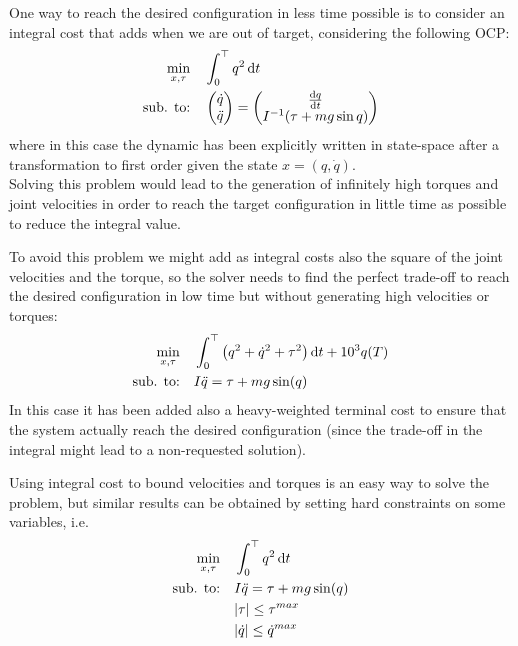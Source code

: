 	One way to reach the desired configuration in less time possible is to consider an integral cost that adds when we are out of target, considering the following OCP:
	\begin{align*}
		\min_{x,\tau} \quad & \int_0^\top  q^2\, \mathrm{d} t \\
		\textrm{sub. to:} \quad & \begin{pmatrix}
			\dot q \\ \ddot q
		\end{pmatrix} = \begin{pmatrix}
			\frac{\mathrm{d} q}{\mathrm{d} t} \\ I^{-1}(\tau + mg\sin q)
		\end{pmatrix}
	\end{align*}
	where in this case the dynamic has been explicitly written in state-space after a transformation to first order given the state $x=(q,\dot q)$.\\
	Solving this problem would lead to the generation of infinitely high torques and joint velocities in order to reach the target configuration in little time as possible to reduce the integral value.
	
	To avoid this problem we might add as integral costs also the square of the joint velocities and the torque, so the solver needs to find the perfect trade-off to reach the desired configuration in low time but without generating high velocities or torques:
	\begin{align*}
		\min_{x,\tau} \quad & \int_0^\top  \big(q^2 + \dot q^2 + \tau^2\big)\, \mathrm{d} t + 10^3 q(T) \\
		\textrm{sub. to:} \quad & I\ddot q = \tau + mg\sin(q)
	\end{align*}
	In this case it has been added also a heavy-weighted terminal cost to ensure that the system actually reach the desired configuration (since the trade-off in the integral might lead to a non-requested solution).
	
	Using integral cost to bound velocities and torques is an easy way to solve the problem, but similar results can be obtained by setting hard constraints on some variables, i.e.
	\begin{align*}
		\min_{x,\tau} \quad & \int_0^\top  q^2\, \mathrm{d} t \\
		\textrm{sub. to:} \quad & I\ddot q = \tau + mg\sin(q) \\
		& |\tau|\leq \tau^{max} \\ & |\dot q| \leq \dot q^{max}
	\end{align*}
	
